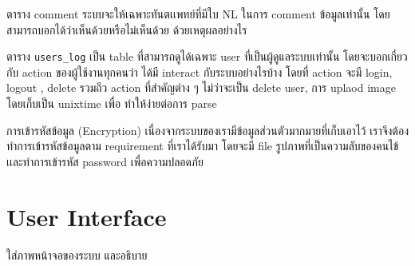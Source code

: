 ตาราง comment ระบบจะให้เฉพาะทันตเเพทย์ที่มีใบ NL ในการ comment ข้อมูลเท่านั้น โดยสามารถบอกได้ว่าเห็นด้วยหรือไม่เห็นด้วย ด้วยเหตุผลอย่างไร 

ตาราง \texttt{users\_log} เป็น table ที่สามารถดูได้เฉพาะ user ที่เป็นผู้ดูแลระบบเท่านั้น 
โดยจะบอกเกี่ยวกับ action ของผู้ใช้งานทุกคนว่า ได้มี interact กับระบบอย่างไรบ้าง โดยที่ action จะมี login, logout , delete รวมถึว action ที่สำคัญต่าง ๆ ไม่ว่าจะเป็น delete user, การ uplaod image โดยเก็บเป็น unixtime เพื่อ ทำให้ง่ายต่อการ parse

การเข้ารหัสข้อมูล (Encryption) เนื่องจากระบบของเรามีข้อมูลส่วนตัวมากมายที่เก็บเอาไว้ เราจึงต้องทำการเข้ารหัสข้อมูลตาม requirement ที่เราได้รับมา โดยจะมี file รูปภาพที่เป็นความลับของคนไข้เเละทำการเข้ารหัส password เพื่อความปลอดภัย

\section{User Interface}
ใส่ภาพหน้าจอของระบบ และอธิบาย
